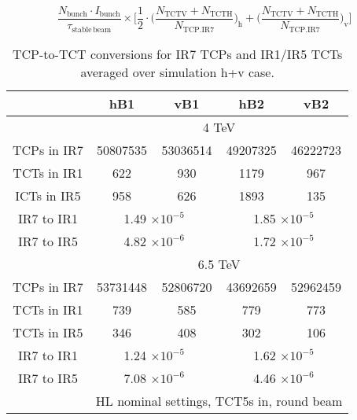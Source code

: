 \begin{equation} \label{eq3}
\frac{N_{\mathrm{bunch}} \cdot I_{\mathrm{bunch}}}{\tau_{\mathrm{stable \, beam}}} \times \Bigg[ \frac{1}{2} \cdot \Big( \frac{N_{\mathrm{TCTV}} + N_{\mathrm{TCTH}}}{N_{\mathrm{TCP.IR7}}}\Big)_{\mathrm{h}} + \Big( \frac{N_{\mathrm{TCTV}} + N_{\mathrm{TCTH}}}{N_{\mathrm{TCP.IR7}}} \Big)_{\mathrm{v}}  \Bigg]
\end{equation}

\begin{table}
   \centering
   \caption{TCP-to-TCT conversions for IR7 TCPs and IR1/IR5 TCTs averaged over simulation h+v case.}

   \begin{tabular}{c|cc|cc}

       & hB1 & vB1 & hB2 & vB2\\ \hline       
       & \multicolumn{4}{c}{4 TeV} \\   %
       TCPs in IR7 & 50807535 & 53036514 & 49207325 & 46222723 \\
       TCTs in IR1 & 622 & 930 & 1179 & 967 \\
       ICTs in IR5 & 958 & 626 & 1893 & 135 \\ %
       IR7 to IR1  & \multicolumn{2}{c|}{1.49 $\times 10^{-5}$} & \multicolumn{2}{c}{1.85 $\times 10^{-5}$ } \\
       IR7 to IR5  & \multicolumn{2}{c|}{4.82 $\times 10^{-6}$} & \multicolumn{2}{c}{1.72 $\times 10^{-5}$ } \\
       \hline
       & \multicolumn{4}{c}{6.5 TeV} \\      
       TCPs in IR7 & 53731448 & 52806720 & 43692659 & 52962459 \\
       TCTs in IR1 & 739 & 585 & 779 & 773 \\
       TCTs in IR5 & 346 & 408 & 302 & 106 \\%
       IR7 to IR1 &  \multicolumn{2}{c|}{1.24 $\times 10^{-5}$} &  \multicolumn{2}{c}{1.62 $\times 10^{-5}$ } \\
       IR7 to IR5 &  \multicolumn{2}{c|}{7.08 $\times 10^{-6}$} &  \multicolumn{2}{c}{4.46 $\times 10^{-6}$ } \\
       \hline       
       & \multicolumn{4}{c}{HL nominal settings, TCT5s in, round beam}  \\ %
       

\end{tabular}
\end{table}
